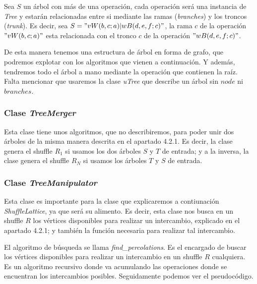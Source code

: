 \documentclass[../main.tex]{subfiles}
\begin{document}
Sea $S$ un \'arbol con m\'as de una operaci\'on, cada operaci\'on ser\'a una instancia de \emph{Tree} y estar\'an relacionadas entre si mediante las ramas (\emph{branches}) y los troncos (\emph{trunk}).
Es decir, sea $S="vW(b,c;a)|wB(d,e,f;c)"$, la rama $c$ de la operaci\'on $"vW(b,c;a)"$ esta relacionada con el tronco $c$ de la operaci\'on $"wB(d,e,f;c)"$.

De esta manera tenemos una estructura de \'arbol en forma de grafo, que podremos explotar con los algoritmos que vienen a continuaci\'on. Y adem\'as, tendremos todo el \'arbol a mano mediante la operaci\'on que contienen la ra\'iz.
Falta mencionar que usaremos la clase \emph{uTree} que describe un \'arbol sin $node$ ni $branches$.

\subsubsection*{Clase \emph{TreeMerger}}
Esta clase tiene unos algoritmos, que no describiremos, para poder unir dos \'arboles de la misma manera descrita en el apartado 4.2.1. Es decir, la clase genera el shuffle $R_1$ si usamos los dos \'arboles $S$ y $T$ de entrada; y a la inversa, la clase genera el shuffle $R_N$ si usamos los \'arboles $T$ y $S$ de entrada.

\subsubsection*{Clase \emph{TreeManipulator}}
Esta clase es importante para la clase que explicaremos a contiunaci\'on \emph{ShuffleLattice}, ya que ser\'a su alimento. Es decir, esta clase nos busca en un shuffle $R$ los v\'ertices disponibles para realizar un intercambio, explicado en el apartado 4.2.1; y tambi\'en la funci\'on necesaria para realizar tal intercambio.

El algoritmo de b\'usqueda se llama \emph{find\_percolations}. Es el encargado de buscar los v\'ertices disponibles para realizar un intercambio en un shuffle $R$ cualquiera.
Es un algoritmo recursivo donde va acumulando las operaciones donde se encuentran los intercambios posibles. Seguidamente podemos ver el pseudoc\'odigo.
\end{document}
